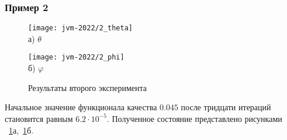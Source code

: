 \begin{frame}
    \frametitle{Пример 2}
    \begin{figure}[h!t]
        \begin{minipage}[b][][b]{0.49\linewidth}
            \centering
            \texttt{[image: jvm-2022/2\_theta]}
            \\ а) $\theta$
        \end{minipage}
        \hfill
        \begin{minipage}[b][][b]{0.49\linewidth}
            \centering
            \texttt{[image: jvm-2022/2\_phi]}
            \\ б) $\varphi$
        \end{minipage}
        \caption{Результаты второго эксперимента}
        \label{fig:4_4:6}
    \end{figure}
    Начальное значение функционала качества $0.045$
    после тридцати итераций становится равным $6.2\cdot10^{-5}$.
    Полученное состояние представлено рисунками ~\ref{fig:4_4:6}а,~\ref{fig:4_4:6}б.

\end{frame}
